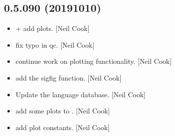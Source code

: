 \documentclass[a4paper,10pt,english]{report}
\begin{document}
\subsection{0.5.090 (2019\sphinxhyphen{}10\sphinxhyphen{}10)}
\label{\detokenize{misc/changelog:id71}}\begin{itemize}
\item {} 
 +  \sphinxhyphen{}
add plots. {[}Neil Cook{]}

\item {} 
 \sphinxhyphen{} fix typo in qc. {[}Neil Cook{]}

\item {} 
 \sphinxhyphen{} continue work on plotting functionality. {[}Neil Cook{]}

\item {} 
 \sphinxhyphen{} add the sigfig function. {[}Neil Cook{]}

\item {} 
Update the language database. {[}Neil Cook{]}

\item {} 
 \sphinxhyphen{} add some plots to
. {[}Neil Cook{]}

\item {} 
 \sphinxhyphen{} add plot constants. {[}Neil
Cook{]}

\end{itemize}
\end{document}
